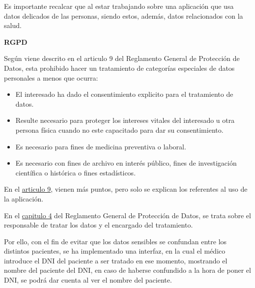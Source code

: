 Es importante recalcar que al estar trabajando sobre una aplicación que usa datos delicados de las personas, siendo estos, además, datos relacionados con la salud. 

\textbf{RGPD}

Según viene descrito en el articulo 9 del Reglamento General de Protección de Datos, esta prohibido hacer un tratamiento de categorías especiales de datos personales a menos que ocurra:
\begin{itemize}
    \item El interesado ha dado el consentimiento explicito para el tratamiento de datos.
    \item Resulte necesario para proteger los intereses vitales del interesado u otra persona física cuando no este capacitado para dar su consentimiento.
    \item Es necesario para fines de medicina preventiva o laboral.
    \item Es necesario con fines de archivo en interés público, fines de investigación científica o histórica o fines estadísticos.
\end{itemize}

En el \href{https://www.boe.es/doue/2016/119/L00001-00088.pdf#page=38}{articulo 9}, vienen más puntos, pero solo se explican los referentes al uso de la aplicación.

En el \href{https://www.boe.es/doue/2016/119/L00001-00088.pdf#page=47}{capitulo 4} del Reglamento General de Protección de Datos, se trata sobre el responsable de  tratar los datos y  el encargado del tratamiento.

Por ello, con el fin de evitar que los datos sensibles se confundan entre los distintos pacientes, se ha implementado una interfaz, en la cual el médico introduce el DNI del paciente a ser tratado en ese momento, mostrando el nombre del paciente del DNI, en caso de haberse confundido a la hora de poner el DNI, se podrá dar cuenta al ver el nombre del paciente. 
